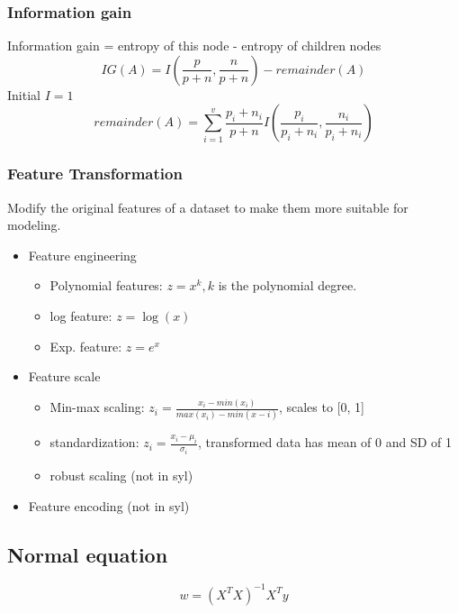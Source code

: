 \documentclass[twocolumn, 10pt]{article}
\begin{document}
    \subsubsection*{Information gain}
    Information gain = entropy of this node - entropy of children nodes
    \[IG(A) = I(\frac{p}{p + n}, \frac{n}{p + n}) - remainder(A)\] Initial $I = 1$
    \[remainder(A) = \sum_{i=1}^{v}\frac{p_i + n_i}{p + n}I(\frac{p_i}{p_i + n_i}, \frac{n_i}{p_i + n_i})\]
\subsubsection*{Feature Transformation}
    Modify the original features of a dataset to make them more suitable for modeling.
    \begin{itemize}
        \item Feature engineering
            \begin{itemize}
                \item Polynomial features: $z = x^k, k$ is the polynomial degree.
                \item log feature: $z = \log(x)$
                \item Exp. feature: $z = e^x$
            \end{itemize}
        \item Feature scale
            \begin{itemize}
                \item Min-max scaling: $z_i = \frac{x_i - min(x_i)}{max(x_i) - min(x-i)}$, scales to [0, 1]
                \item standardization: $z_i = \frac{x_i - \mu_i}{\sigma_i}$, transformed data has mean of 0 and SD of 1
                \item robust scaling (not in syl)
            \end{itemize}
        \item Feature encoding (not in syl)
    \end{itemize}
\subsection*{Normal equation}
\[w = (X^T X)^{-1} X^T y\]
\end{document}
